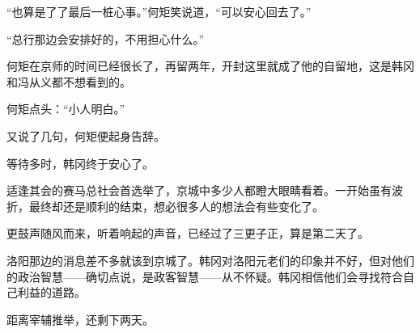 “也算是了了最后一桩心事。”何矩笑说道，“可以安心回去了。”

“总行那边会安排好的，不用担心什么。”

何矩在京师的时间已经很长了，再留两年，开封这里就成了他的自留地，这是韩冈和冯从义都不想看到的。

何矩点头：“小人明白。”

又说了几句，何矩便起身告辞。

等待多时，韩冈终于安心了。

适逢其会的赛马总社会首选举了，京城中多少人都瞪大眼睛看着。一开始虽有波折，最终却还是顺利的结束，想必很多人的想法会有些变化了。

更鼓声随风而来，听着响起的声音，已经过了三更子正，算是第二天了。

洛阳那边的消息差不多就该到京城了。韩冈对洛阳元老们的印象并不好，但对他们的政治智慧——确切点说，是政客智慧——从不怀疑。韩冈相信他们会寻找符合自己利益的道路。

距离宰辅推举，还剩下两天。

